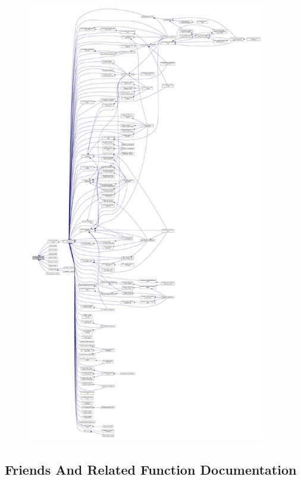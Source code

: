 \begin{figure}[H]
\begin{center}
\leavevmode
\includegraphics[height=550pt]{d8/da3/classstructural__object_a7b0b509094451578b2dc10a9b716b16e_icgraph}
\end{center}
\end{figure}


\subsection{Friends And Related Function Documentation}
\mbox{\label{classstructural__object_a8e2edcd5aaf72ad547d05b0207774667}} 

